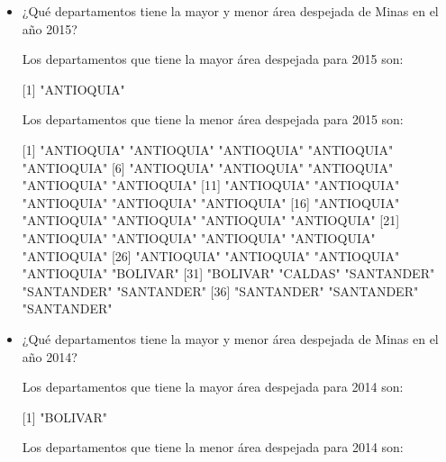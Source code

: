 \begin{itemize}
\begin{kframe}
\begin{alltt}
\hlopt{$}
\end{alltt}
\end{kframe}[1] "ANTIOQUIA" "ANTIOQUIA" "SANTANDER" "SANTANDER" "TOLIMA"   




	\item ¿Qué departamentos tiene la mayor y menor área despejada de Minas en el año 2015?

	
	Los departamentos que tiene la mayor área despejada para 2015 son:
	
	
\begin{kframe}
\begin{alltt}
\hlopt{$}
\end{alltt}
\end{kframe}[1] "ANTIOQUIA"

	Los departamentos que tiene la menor área despejada para 2015 son:
	
	
\begin{kframe}
\begin{alltt}
\hlopt{$}
\end{alltt}
\end{kframe} [1] "ANTIOQUIA" "ANTIOQUIA" "ANTIOQUIA" "ANTIOQUIA" "ANTIOQUIA"
 [6] "ANTIOQUIA" "ANTIOQUIA" "ANTIOQUIA" "ANTIOQUIA" "ANTIOQUIA"
[11] "ANTIOQUIA" "ANTIOQUIA" "ANTIOQUIA" "ANTIOQUIA" "ANTIOQUIA"
[16] "ANTIOQUIA" "ANTIOQUIA" "ANTIOQUIA" "ANTIOQUIA" "ANTIOQUIA"
[21] "ANTIOQUIA" "ANTIOQUIA" "ANTIOQUIA" "ANTIOQUIA" "ANTIOQUIA"
[26] "ANTIOQUIA" "ANTIOQUIA" "ANTIOQUIA" "ANTIOQUIA" "BOLIVAR"  
[31] "BOLIVAR"   "CALDAS"    "SANTANDER" "SANTANDER" "SANTANDER"
[36] "SANTANDER" "SANTANDER" "SANTANDER"




	\item ¿Qué departamentos tiene la mayor y menor área despejada de Minas en el año 2014?

	Los departamentos que tiene la mayor área despejada para 2014 son:
	
	
\begin{kframe}
\begin{alltt}
\hlopt{$}
\end{alltt}
\end{kframe}[1] "BOLIVAR"

	Los departamentos que tiene la menor área despejada para 2014 son:
	

\end{itemize}
